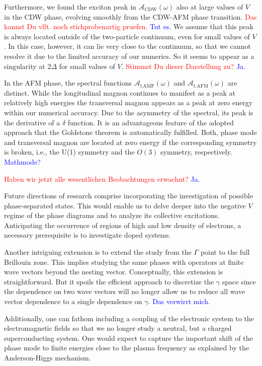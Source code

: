 \documentclass[
    reprint, 
    aps,
    preprintnumbers,
    twocolumn,
    prb,
    superscriptaddress
]{revtex4-2}
\newcommand{\spectral}[1]{\mathcal{A}_\text{#1}  (\omega)}
\newcommand{\red}[1]{\textcolor{red}{#1}}
\newcommand{\blue}[1]{\textcolor{blue}{#1}}
\begin{document}
Furthermore, we found the exciton peak in $\spectral{CDW}$ also at large values of $V$ in the CDW phase, 
evolving smoothly from the CDW-AFM phase transition. \red{Das kannst Du vllt. noch stichprobenartig pruefen.} \blue{Tut es.}
We assume that this peak is always located outside of the two-particle continuum, even for small values of $V$.
In this case, however, it can lie very close to the continuum, so that we cannot resolve it due to the limited accuracy of our numerics.
So it seems to appear as a singularity at $2\Delta$ for small values of $V$.
\red{Stimmst Du dieser Darstellung zu?} \blue{Ja.}

In the AFM phase, the spectral functions $\spectral{l.AMF}$ and $\spectral{t.AFM}$ are distinct.
While the longitudinal magnon continues to manifest as a peak at relatively high energies
the transversal magnon appears as a peak at zero energy within our numerical accuracy. Due to
the asymmetry of the spectral, its peak is the derivative of a $\delta$ function.
It is an advantageous feature of the adopted approach that the Goldstone theorem is 
automatically fulfilled. Both, phase mode and transversal magnon are located at zero energy
if the corresponding symmetry is broken, i.e., the U(1) symmetry and the $O(3)$ symmetry,
respectively. \blue{Mathmode?}

\red{Haben wir jetzt alle wesentlichen Beobachtungen erwaehnt?} \blue{Ja.}


Future directions of research comprise incorporating the investigation of possible phase-separated states. 
This would enable us to delve deeper into the negative $V$ regime 
of the phase diagrams and to analyze its collective excitations. Anticipating the occurrence
of regions of high and low density of electrons, a necessary prerequisite is to investigate doped systems.

Another intriguing extension is to extend the study from the $\Gamma$ point to the full Brillouin zone.
This implies studying the same phases with operators at finite wave vectors beyond the nesting vector. 
Conceptually, this extension is straightforward. But it spoils the efficient approach
to discretize the $\gamma$ space since the dependence on two wave vectors will no longer
allow us to reduce all wave vector dependence to a single dependence on $\gamma$. \blue{Das verwirrt mich.}

Additionally, one can fathom including a coupling of the electronic system to the electromagnetic fields
so that we no longer study a neutral, but a charged superconducting system. One would expect
to capture the important shift of the phase mode to finite energies close to the plasma frequency 
as explained by the Anderson-Higgs mechanism.
\end{document}
